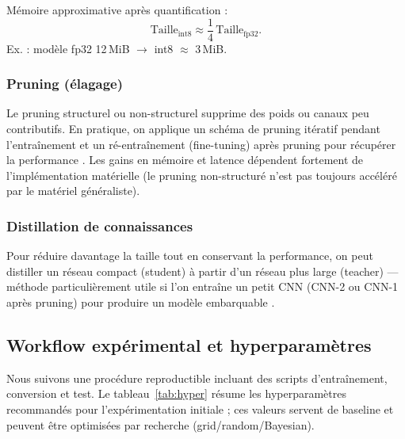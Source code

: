 Mémoire approximative après quantification :
\[
	\text{Taille}_{\text{int8}} \approx \frac{1}{4}\,\text{Taille}_{\text{fp32}}.
\]
Ex. : modèle fp32 12\,MiB \(\rightarrow\) int8 \(\approx\) 3\,MiB.

\subsubsection{Pruning (élagage)}

Le pruning structurel ou non-structurel supprime des poids ou canaux peu contributifs. En pratique, on applique un schéma de pruning itératif pendant l'entraînement et un ré-entraînement (fine-tuning) après pruning pour récupérer la performance \cite{hinton2015distillation}. Les gains en mémoire et latence dépendent fortement de l'implémentation matérielle (le pruning non-structuré n'est pas toujours accéléré par le matériel généraliste).

\subsubsection{Distillation de connaissances}

Pour réduire davantage la taille tout en conservant la performance, on peut distiller un réseau compact (student) à partir d'un réseau plus large (teacher) — méthode particulièrement utile si l’on entraîne un petit CNN (CNN-2 ou CNN-1 après pruning) pour produire un modèle embarquable \cite{hinton2015distillation}.

\subsection{Workflow expérimental et hyperparamètres}

Nous suivons une procédure reproductible incluant des scripts d'entraînement, conversion et test. Le tableau~\ref{tab:hyper} résume les hyperparamètres recommandés pour l'expérimentation initiale ; ces valeurs servent de baseline et peuvent être optimisées par recherche (grid/random/Bayesian).

